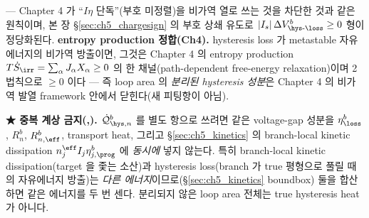 — Chapter 4 가 ``$I\eta$ 단독''(부호 미정렬)을 비가역 열로 쓰는 것을 차단한 것과 같은 원칙이며, 본 장
\S\ref{sec:ch5_chargesign} 의 부호 상쇄 유도로 $|I_s|\,\Delta V_{\hys\text{-}\loss}^b\ge0$ 형이 정당화된다.
\textbf{entropy production 정합(Ch4).} hysteresis loss 가 metastable 자유에너지의 비가역 방출이면, 그것은
Chapter 4 의 entropy production $T\dot S_\irr=\sum_\alpha J_\alpha X_\alpha\ge0$ 의 한 채널(path-dependent
free-energy relaxation)이며 2법칙으로 $\ge0$ 이다 — 즉 loop area 의 \emph{분리된 hysteresis 성분}은 Chapter 4
의 비가역 발열 framework 안에서 닫힌다(새 피팅항이 아님).
\begin{boundbox}
\textbf{★ 중복 계상 금지(,).} $\dot{\mathcal Q}_{\hys,n}^b$ 를 별도 항으로 쓰려면 같은 voltage-gap
성분을 $\eta_\loss^b$, $R_n^b$, $R_{n,\eff}^b$, transport heat, 그리고 \S\ref{sec:ch5_kinetics} 의 branch-local
kinetic dissipation $n_j^{\eff}I_j\eta_{j,\prog}^b$ 에 \emph{동시에} 넣지 않는다. 특히 branch-local kinetic
dissipation(target 을 좇는 소산)과 hysteresis loss(branch 가 true 평형으로 풀릴 때의 자유에너지 방출)는
\emph{다른 에너지}이므로(\S\ref{sec:ch5_kinetics} boundbox) 둘을 합산하면 같은 에너지를 두 번 센다. 분리되지
않은 loop area 전체는 true hysteresis heat 가 아니다.
\end{boundbox}

